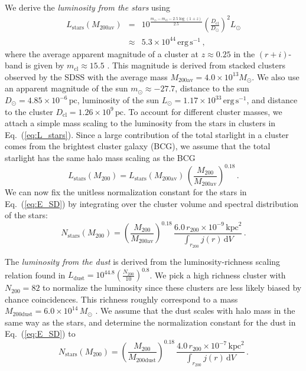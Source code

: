 \documentclass[10pt,aps,pra,reprint,amsmath,amsfonts,amssymb,showpacs,nofootinbib,floatfix]{revtex4-1}
\newcommand{\rmn}{\mathrm}
\newcommand{\clu}{\rmn{cl}}
\newcommand{\msun}{M_\odot}
\newcommand{\stars}{\rmn{stars}}
\newcommand{\dust}{\rmn{dust}}
\newcommand{\kpc}{\rmn{kpc}}
\newcommand{\dd}{\rmn{d}}
\newcommand{\rvir}{r_{200}}
\newcommand{\mvir}{M_{200}}
\begin{document}
We derive the {\em luminosity from the stars} using
\begin{eqnarray}
L_\stars(M_{200\rmn{av}})&=&10^{\frac{m_\odot-m_\rmn{cl}-2.5\log\left(1+z\right)}{2.5}}
\left(\frac{D_\clu}{D_\odot}\right)^2 L_\odot\nonumber\\
&\approx& 5.3\times10^{44}\,\rmn{erg}\,\rmn{s}^{-1}\,,
\label{eq:L_stars}
\end{eqnarray}
where the average apparent magnitude of a cluster at $z\approx 0.25$
in the $(r+i)$-band is given by $m_\rmn{cl}\approx 15.5$
\cite{2005MNRAS.358..949Z}. This magnitude is derived from stacked
clusters observed by the SDSS with the average mass
$M_{200\rmn{av}}=4.0\times10^{13}\msun$. We also use an apparent
magnitude of the sun $m_\odot\approx -27.7$, distance to the sun
$D_\odot=4.85\times10^{-6}\,\rmn{pc}$, luminosity of the sun
$L_\odot=1.17\times10^{33}\,\rmn{erg\,s}^{-1}$, and distance to the
cluster $D_\clu=1.26\times10^9\,\rmn{pc}$. To account for different
cluster masses, we attach a simple mass scaling to the luminosity from
the stars in clusters in Eq.~(\ref{eq:L_stars}).  Since a large
contribution of the total starlight in a cluster comes from the
brightest cluster galaxy (BCG), we assume that the total starlight has
the same halo mass scaling as the BCG \cite{2010ApJ...713.1037H}
\begin{equation}
L_\stars(\mvir)=L_\stars(M_{200\rmn{av}})\,
\left(\frac{\mvir}{M_{200\rmn{av}}}\right)^{0.18}\,.
\label{eq:L_stars_m}
\end{equation} 
We can now fix the unitless normalization constant for the stars in
Eq.~(\ref{eq:E_SD}) by integrating over the cluster volume and
spectral distribution of the stars:
\begin{equation}
 N_\stars(\mvir) = 
\left(\frac{\mvir}{M_{200\rmn{av}}}\right)^{0.18}\,
\frac{6.0\,\rvir\times10^{-9}\,\kpc^2}{\int_{\rvir} j(r) \,\dd V}\,.
\label{eq:N_stars}
\end{equation}

The {\em luminosity from the dust} is derived from the
luminosity-richness scaling relation found in
\cite{2008A&A...490..547G}
$L_\dust=10^{44.8}\left(\frac{N_{200}}{10}\right)^{0.8}$. We pick a
high richness cluster with $N_{200}=82$ to normalize the luminosity
since these clusters are less likely biased by chance
coincidences. This richness roughly correspond to a mass
$M_\rmn{200dust}=6.0\times10^{14}\,\msun$
\cite{2010ApJ...713.1037H}. We assume that the dust scales with halo
mass in the same way as the stars, and determine the normalization
constant for the dust in Eq.~(\ref{eq:E_SD}) to
\begin{equation}
 N_\stars(\mvir) = 
\left(\frac{\mvir}{M_\rmn{200dust}}\right)^{0.18}\,
\frac{4.0\,\rvir\times10^{-7}\,\kpc^2}{\int_{\rvir} j(r) \,\dd V}\,.
\label{eq:N_dust}
\end{equation}
\end{document}
